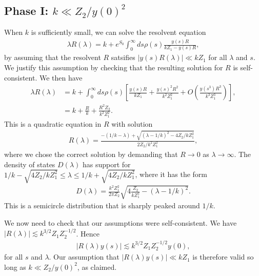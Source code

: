 \documentclass[12pt]{article}
\numberwithin{equation}{section}
\begin{document}
\subsection*{Phase I: $k \ll Z_2/y(0)^2$}
When $k$ is sufficiently small, we can solve the resolvent equation
\begin{align}
\lambda R(\lambda)  = k + e^{S_0}\int_0^\infty ds \rho(s) \frac{y(s) R}{k Z_1 - y(s) R},
\end{align}
by assuming that the resolvent $R$ satsifies $|y(s) R(\lambda)| \ll k Z_1$  for all $\lambda$ and  $s$. We justify this assumption by checking that the resulting solution for $R$ is self-consistent. We then have
\begin{align} \label{eq:taylor}
 \lambda R(\lambda) & = k + \int_0^\infty ds \rho(s) \left[\frac{y(s) R}{k Z_1} + \frac{y(s)^2 R^2}{k^2 Z_1^2} + O(\frac{y(s^3) R^3}{k^3 Z_1^3})\right],
\\& = k + \frac{R}{k} + \frac{R^2 Z_2}{k^2 Z_1^2}.
\end{align}
This is a quadratic equation in $R$ with solution
\begin{align} \label{eq:semicircle}
R(\lambda) = \frac{- (1/k - \lambda) + \sqrt{(\lambda - 1/k)^2 - 4 Z_2 / k Z_1^2 }}{2 Z_2 / k^2 Z_1^2},
\end{align}
where we chose the correct solution by demanding that $R \to 0$ as $\lambda \to \infty$. The density of states $D(\lambda)$ has support for $1/k - \sqrt{4 Z_2 / k Z_1^2} \leq \lambda \leq 1/k + \sqrt{4 Z_2 / k Z_1^2}$, where it has the form
\begin{align}
D(\lambda) = \frac{k^2 Z_1^2}{2 \pi  Z_2 } \sqrt{ 4 \frac{Z_2 }{ k Z_1^2} - ( \lambda - 1/k)^2 }.
\end{align}
This is a semicircle distribution that is sharply peaked around $1/k$.

We now need to check that our assumptions were self-consistent. We have $| R( \lambda) | \lesssim k^{3/2} Z_1 Z_2^{-1/2}$. Hence
\begin{align}
| R(\lambda) y(s) | \lesssim  k^{3/2} Z_1 Z_2^{-1/2} y(0),
\end{align}
for all $s$ and $\lambda$. Our assumption that $| R(\lambda) y(s) | \ll k Z_1$ is therefore valid so long as $k \ll Z_2 / y(0)^2$, as claimed.
\end{document}
